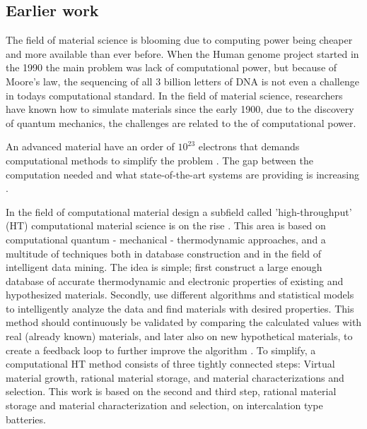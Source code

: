 \subsection{Earlier work}

The field of material science is blooming due to computing power being cheaper and more available than ever before. When the Human genome project started in the 1990 the main problem was lack of computational power, but because of Moore's law, the sequencing of all 3 billion letters of DNA is not even a challenge in todays computational standard. In the field of material science, researchers have known how to simulate materials since the early 1900, due to the discovery of quantum mechanics, the challenges are related to the of computational power.

An advanced material have an order of $10^{23}$ electrons that demands computational methods to simplify the problem \cite{electromaterials}. The gap between the computation needed and what state-of-the-art systems are providing is increasing \cite{reddy2011linden}.

In the field of computational material design a subfield called 'high-throughput' (\ac{HT}) computational material science is on the rise \cite{potyrailo2011combinatorial} \cite{pang2020additive}. This area is based on computational quantum - mechanical - thermodynamic approaches, and a multitude of techniques both in database construction and in the field of intelligent data mining. The idea is simple; first construct a large enough database of accurate thermodynamic and electronic properties of existing and hypothesized materials. Secondly, use different algorithms and statistical models to intelligently analyze the data and find materials with desired properties. This method should continuously be validated by comparing the calculated values with real  (already known) materials, and later also on new hypothetical materials, to create a feedback loop to further improve the algorithm \cite{curtarolo2013high}. To simplify, a computational HT method consists of three tightly connected steps: Virtual material growth, rational material storage, and material characterizations and selection. This work is based on the second and third step, rational material storage and material characterization and selection, on intercalation type batteries.

